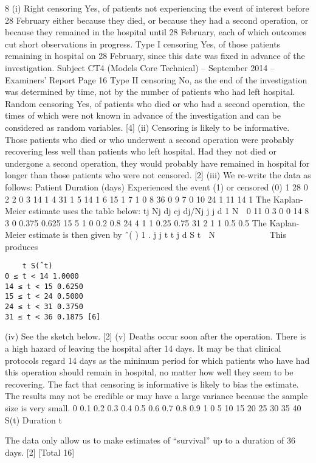 \documentclass[a4paper,12pt]{article}
\begin{document}
\newpage
  8 (i) Right censoring
Yes, of patients not experiencing the event of interest before 28 February
either because they died, or because they had a second operation, or because
they remained in the hospital until 28 February, each of which outcomes cut
short observations in progress.
Type I censoring
Yes, of those patients remaining in hospital on 28 February, since this date
was fixed in advance of the investigation.
Subject CT4 (Models Core Technical) – September 2014 – Examiners’ Report
Page 16
Type II censoring
No, as the end of the investigation was determined by time, not by the number
of patients who had left hospital.
Random censoring
Yes, of patients who died or who had a second operation, the times of which
were not known in advance of the investigation and can be considered as
random variables. [4]
(ii) Censoring is likely to be informative.
Those patients who died or who underwent a second operation were
probably recovering less well than patients who left hospital.
Had they not died or undergone a second operation, they would probably
have remained in hospital for longer than those patients who were not
censored. [2]
(iii) We re-write the data as follows:
  Patient Duration (days) Experienced the event (1)
or censored (0)
1 28 0
2 2 0
3 14 1
4 31 1
5 14 1
6 15 1
7 1 0
8 36 0
9 7 0
10 24 1
11 14 1
The Kaplan-Meier estimate uses the table below:
  tj Nj dj cj dj/Nj j
j
d
1
N

0 11 0 3 0 0
14 8 3 0 0.375 0.625
15 5 1 0 0.2 0.8
24 4 1 1 0.25 0.75
31 2 1 1 0.5 0.5
The Kaplan-Meier estimate is then given by
ˆ( ) 1 . j
j
t t
j
d
S t
 N
 
    
 
This produces
\begin{verbatim}
    t S(ˆt)
0 ≤ t < 14 1.0000
14 ≤ t < 15 0.6250
15 ≤ t < 24 0.5000
24 ≤ t < 31 0.3750
31 ≤ t < 36 0.1875 [6]
\end{verbatim}

(iv) See the sketch below.
[2]
(v) Deaths occur soon after the operation.
There is a high hazard of leaving the hospital after 14 days.
It may be that clinical protocols regard 14 days as the minimum period for
which patients who have had this operation should remain in hospital, no
matter how well they seem to be recovering.
The fact that censoring is informative is likely to bias the estimate.
The results may not be credible or may have a large variance because the
sample size is very small.
0
0.1
0.2
0.3
0.4
0.5
0.6
0.7
0.8
0.9
1
0 5 10 15 20 25 30 35 40
S(t)
Duration t

The data only allow us to make estimates of “survival” up to a duration of 36
days. [2]
[Total 16]

\end{document}
